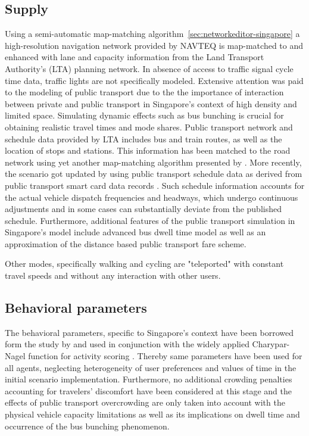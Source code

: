 \subsection{Supply}
Using a semi-automatic map-matching algorithm~\ref{sec:networkeditor-singapore} a high-resolution navigation network provided by NAVTEQ is map-matched to and enhanced with lane and capacity information from the Land Transport Authority's (LTA) planning network. In absence of access to traffic signal cycle time data, traffic lights are not specifically modeled. Extensive attention was paid to the modeling of public transport due to the the importance of interaction between private and public transport in Singapore’s context of high density and limited space. Simulating dynamic effects such as bus bunching is crucial for obtaining realistic travel times and mode shares. Public transport network and schedule data provided by LTA includes bus and train routes,  as well as the location of stops and stations. This information has been matched to the road network using yet another map-matching algorithm presented by \citet[][]{Ordonez_HKSTS_2011, Ordonez_Webpage_2011_4}. More recently, the scenario got updated by using public transport schedule data as derived from public transport smart card data records \citet[][]{Fourie_TechRep_FCL_2014}. Such schedule information accounts for the actual vehicle dispatch frequencies and headways, which undergo continuous adjustments and in some cases can substantially deviate from the published schedule. Furthermore, additional features of the public transport simulation in Singapore’s model include advanced bus dwell time model \citep[][]{SunEtAl_TransResA_2014} as well as an approximation of the distance based public transport fare scheme.

Other modes, specifically walking and cycling are "teleported" with constant travel speeds and without any interaction with other users. 

\subsection{Behavioral parameters}
The behavioral parameters, specific to Singapore's context have been borrowed form the study by \citet[][]{LTA_unpub_2009} and used in conjunction with the widely applied Charypar-Nagel function for activity scoring \citet[][]{CharyparNagel2005ga4acts}. Thereby same parameters have been used for all agents, neglecting heterogeneity of user preferences and values of time in the initial scenario implementation. Furthermore, no additional crowding penalties accounting for travelers' discomfort have been considered at this stage and the effects of public transport overcrowding are only taken into account with the physical vehicle capacity limitations as well as its implications on dwell time and occurrence of the bus bunching phenomenon. 

